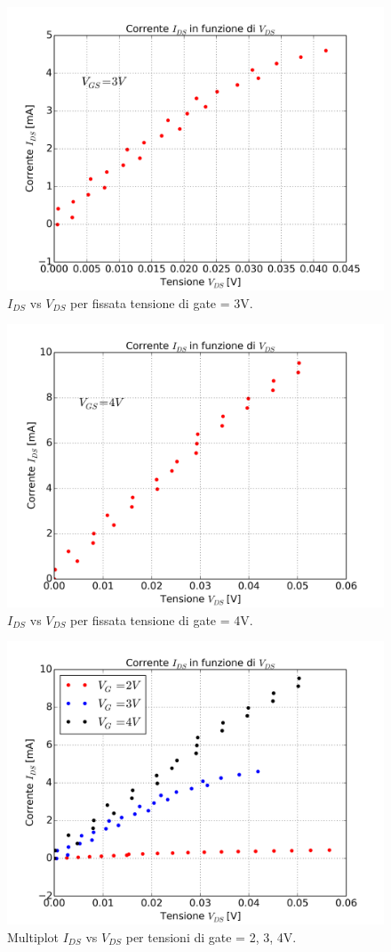 \documentclass[journal, a4paper]{IEEEtran}
\begin{document}
\begin{figure}
\centering
\includegraphics[width=0.8\linewidth]{./es9_prova_vg3}
\caption{$I_{DS}$ vs $V_{DS}$ per fissata tensione di gate = 3V.}
\label{fig:es9_prova_vg3}
\end{figure}

\begin{figure}
\centering
\includegraphics[width=0.8\linewidth]{./es9_prova_vg4}
\caption{$I_{DS}$ vs $V_{DS}$ per fissata tensione di gate = 4V.}
\label{fig:es9_prova_vg4}
\end{figure}

\begin{figure}
\centering
\includegraphics[width=0.9\linewidth]{./es9_multivg}
\caption{Multiplot $I_{DS}$ vs $V_{DS}$ per tensioni di gate = 2, 3, 4V.}
\label{fig:es9_multivg}
\end{figure}
\end{document}
